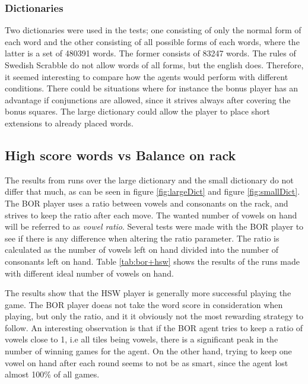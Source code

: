 \documentclass[a4paper, 12pt]{report}
\begin{document}
\subsubsection{Dictionaries}
Two dictionaries were used in the tests; one consisting of only the normal form of each word and the other consisting of all possible forms of each words, where the latter is a set of 480391 words. The former consists of 83247 words. The rules of Swedish Scrabble do not allow words of all forms, but the english does. Therefore, it seemed interesting to compare how the agents would perform with different conditions. There could be situations where for instance the bonus player has an advantage if conjunctions are allowed, since it strives always after covering the bonus squares. The large dictionary could allow the player to place short extensions to already placed words.

\graphicspath{{../results/Plots/}}
\subsection{High score words vs Balance on rack}

The results from runs over the large dictionary and the small dictionary do not differ that much, as can be seen in figure \ref{fig:largeDict} and figure \ref{fig:smallDict}.
The BOR player uses a ratio between vowels and consonants on the rack, and strives to keep the ratio after each move. The wanted number of vowels on hand will be referred to as \emph{vowel ratio}. Several tests were made with the BOR player to see if there is any difference when altering the ratio parameter. The ratio is calculated as the number of vowels left on hand divided into the number of consonants left on hand. Table \ref{tab:bor+hsw} shows the results of the runs made with different ideal number of vowels on hand.

The results show that the HSW player is generally more successful playing the game. The BOR player doeas not take the word score in consideration when playing, but only the ratio, and it it obviously not the most rewarding strategy to follow. An interesting observation is that if the BOR agent tries to keep a ratio of vowels close to 1, i.e all tiles being vowels, there is a significant peak in the number of winning games for the agent. On the other hand, trying to keep one vowel on hand after each round seems to not be as smart, since the agent lost almost 100\% of all games.
\end{document}
